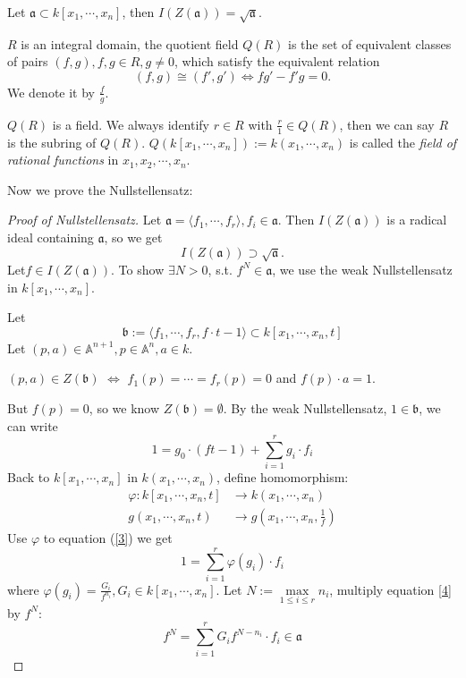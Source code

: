 \begin{theorem}[Nullstallensatz]
	Let $ \mathfrak{a}\subset k[x_1,\cdots,x_n] $, then $ I(Z(\mathfrak{a}))=\sqrt{\mathfrak{a}} $.
\end{theorem}
\begin{definition}
	$ R $ is an integral domain, the quotient field $ Q(R) $ is the set of equivalent classes of pairs $ (f,g), f,g\in R, g\neq 0 $, which satisfy the equivalent relation
	$$
		(f,g)\cong (f',g') \Leftrightarrow fg'-f'g=0.
	$$
	We denote it by $ \frac{f}{g} $.
\end{definition}
\begin{remark}
	$ Q(R) $ is a field. We always identify $ r\in R $ with $ \frac{r}{1}\in Q(R) $, then we can say $ R $ is the subring of $ Q(R) $. $ Q(k[x_1,\cdots,x_n]):=k(x_1,\cdots,x_n) $ is called the \textit{field of rational functions} in $ x_1,x_2,\cdots,x_n $.
\end{remark}
Now we prove the Nullstellensatz:
\begin{proof}[Proof of Nullstellensatz]
	Let $ \mathfrak{a} = \langle f_1,\cdots, f_r\rangle, f_i\in \mathfrak{a} $. Then $ I(Z(\mathfrak{a}))  $ is a radical ideal containing $ \mathfrak{a} $, so we get
	$$
		I(Z(\mathfrak{a}))\supset \sqrt{\mathfrak{a}}.
	$$
	Let$ f\in I(Z(\mathfrak{a})) $. To show $ \exists N>0 $, s.t. $ f^N\in \mathfrak{a} $, we use the weak Nullstellensatz in $ k[x_1,\cdots,x_n] $.

	Let
	\begin{equation}
		\mathfrak{b}:=\langle f_1,\cdots,f_r,f\cdot t -1\rangle\subset k[x_1,\cdots,x_n,t]
	\end{equation}
	Let $ (p,a)\in \mathbb{A}^{n+1}, p\in \mathbb{A}^n, a\in k $.
	\begin{center}
		$ (p,a)\in Z(\mathfrak{b}) $ $ \Leftrightarrow $ $ f_1(p)=\cdots=f_r(p)=0 $ and $ f(p)\cdot a=1 $.
	\end{center}
	But $ f(p)=0 $, so we know $ Z(\mathfrak{b})=\emptyset $. By the weak Nullstellensatz, $ 1\in \mathfrak{b} $, we can write
	\begin{equation}
		1=g_0\cdot (ft-1)+\sum\limits_{i=1}^{r}g_i\cdot f_i\label{3}
	\end{equation}
	Back to $ k[x_1,\cdots,x_n] $ in $ k(x_1,\cdots,x_n) $, define homomorphism:
	$$
		\begin{array}{cc}
			\varphi: k[x_1,\cdots,x_n,t] & \to k(x_1,\cdots,x_n)             \\
			g(x_1,\cdots,x_n,t)          & \to g(x_1,\cdots,x_n,\frac{1}{f})
		\end{array}
	$$
	Use $ \varphi $ to equation (\ref{3}) we get
	\begin{equation}
		1=\sum\limits_{i=1}^{r}\varphi (g_i)\cdot f_i\label{4}
	\end{equation}
	where $ \varphi(g_i)=\frac{G_i}{f^{n_i}},G_i\in k[x_1,\cdots,x_n] $. Let $ N:=\max\limits_{1\leq i\leq r}n_i $, multiply equation \ref{4} by $ f^N $:
	\begin{equation}
		f^N=\sum\limits_{i=1}^{r}G_if^{N-n_i}\cdot f_i\in \mathfrak{a}
	\end{equation}
\end{proof}
